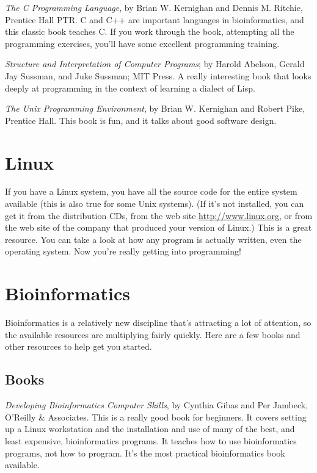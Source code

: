 \textit{The C Programming Language}, by Brian W. Kernighan and Dennis M. Ritchie, Prentice Hall PTR. C and C++ are important languages in bioinformatics, and this classic book teaches C. If you work through the book, attempting all the programming exercises, you'll have some excellent programming training.

\textit{Structure and Interpretation of Computer Programs}; by Harold Abelson, Gerald Jay Sussman, and Juke Sussman; MIT Press. A really interesting book that looks deeply at programming in the context of learning a dialect of Lisp.

\textit{The Unix Programming Environment}, by Brian W. Kernighan and Robert Pike, Prentice Hall. This book is fun, and it talks about good software design.

\section{Linux}
If you have a Linux system, you have all the source code for the entire system available (this is also true for some Unix systems). (If it's not installed, you can get it from the distribution CDs, from the web site \href{http://www.linux.org}{http://www.linux.org}, or from the web site of the company that produced your version of Linux.) This is a great resource. You can take a look at how any program is actually written, even the operating system. Now you're really getting into programming!

\section{Bioinformatics}
Bioinformatics is a relatively new discipline that's attracting a lot of attention, so the available resources are multiplying fairly quickly. Here are a few books and other resources to help get you started.

\subsection{Books}
\textit{Developing Bioinformatics Computer Skills}, by Cynthia Gibas and Per Jambeck, O'Reilly \& Associates. This is a really good book for beginners. It covers setting up a Linux workstation and the installation and use of many of the best, and least expensive, bioinformatics programs. It teaches how to use bioinformatics programs, not how to program. It's the most practical bioinformatics book available.

